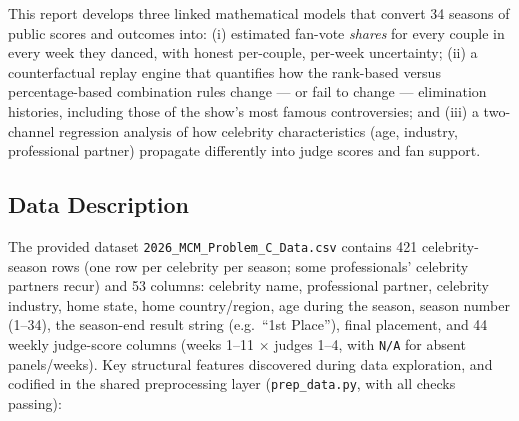 \documentclass[10pt]{article}
\begin{document}
This report develops three linked mathematical models that convert 34 seasons of public
scores and outcomes into: (i) estimated fan-vote \emph{shares} for every couple in every
week they danced, with honest per-couple, per-week uncertainty; (ii) a counterfactual
replay engine that quantifies how the rank-based versus percentage-based combination rules
change --- or fail to change --- elimination histories, including those of the show's most
famous controversies; and (iii) a two-channel regression analysis of how celebrity
characteristics (age, industry, professional partner) propagate differently into judge
scores and fan support.

\subsection{Data Description}

The provided dataset \texttt{2026\_MCM\_Problem\_C\_Data.csv} contains 421 celebrity-season
rows (one row per celebrity per season; some professionals' celebrity partners recur) and
53 columns: celebrity name, professional partner, celebrity industry, home state, home
country/region, age during the season, season number (1--34), the season-end result string
(e.g.\ ``1st Place''), final placement, and 44 weekly judge-score columns (weeks 1--11
$\times$ judges 1--4, with \texttt{N/A} for absent panels/weeks). Key structural features
discovered during data exploration, and codified in the shared preprocessing layer
(\texttt{prep\_data.py}, with all checks passing):
\end{document}
